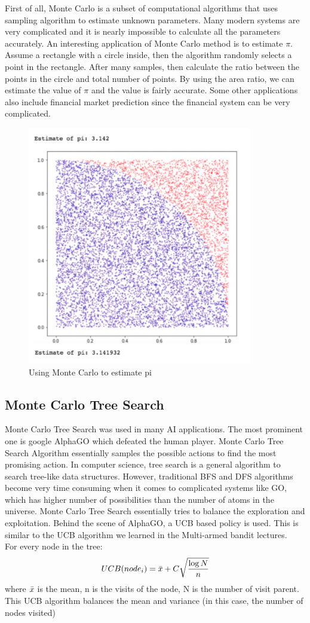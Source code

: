 \documentclass[11pt]{article}
\begin{document}
First of all, Monte Carlo is a subset of computational algorithms that uses sampling algorithm to estimate unknown parameters. Many modern systems are very complicated and it is nearly impossible to calculate all the parameters accurately. An interesting application of Monte Carlo method is to estimate $\pi$. Assume a rectangle with a circle inside, then the algorithm randomly selects a point in the rectangle. After many samples, then calculate the ratio between the points in the circle and total number of points. By using the area ratio, we can estimate the value of $\pi$ and the value is fairly accurate. Some other applications also include financial market prediction since the financial system can be very complicated.  
\begin{figure}[H]
    \centering
    \includegraphics[width=0.35\linewidth]{images/pi estimation.png}
    \caption{Using Monte Carlo to estimate pi}
    \label{fig:lambda-return_params}
\end{figure}

\subsection{Monte Carlo Tree Search}
Monte Carlo Tree Search was used in many AI applications. The most prominent one is google AlphaGO which defeated the human player. Monte Carlo Tree Search Algorithm essentially samples the possible actions to find the most promising action. In computer science, tree search is a general algorithm to search tree-like data structures. However, traditional BFS and DFS algorithms become very time consuming when it comes to complicated systems like GO, which has higher number of possibilities than the number of atoms in the universe. Monte Carlo Tree Search essentially tries to balance the exploration and exploitation. Behind the scene of AlphaGO, a UCB based policy is used. This is similar to the UCB algorithm we learned in the Multi-armed bandit lectures. \\
For every node in the tree:\\
$$UCB(node_i) = \Bar{x} +C\sqrt{\dfrac{\log{N}}{n}}$$ 
where $\Bar{x}$ is the mean, n is the visits of the node, N is the number of visit parent. This UCB algorithm balances the mean and variance (in this case, the number of nodes visited)
\end{document}
